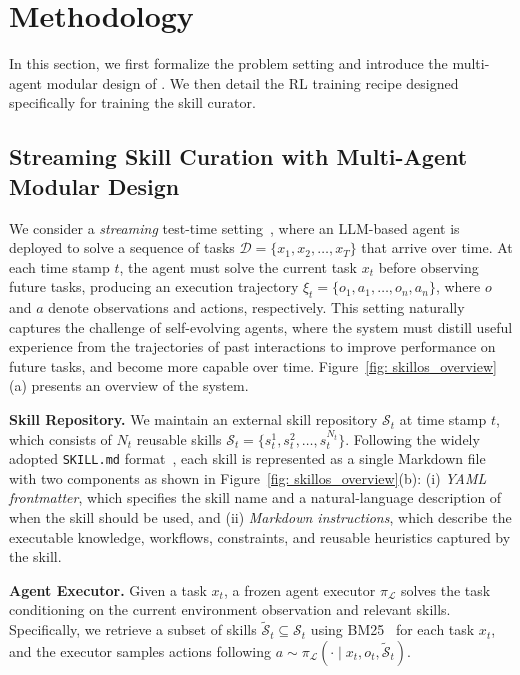 \section{Methodology}

In this section, we first formalize the problem setting and introduce the multi-agent modular design of \ours{}. We then detail the RL training recipe designed specifically for training the skill curator.

\subsection{Streaming Skill Curation with Multi-Agent Modular Design}

We consider a \textit{streaming} test-time setting~\citep{wu2024streambench}, where an LLM-based agent is deployed to solve a sequence of tasks
$\mathcal{D}=\{x_1,x_2,\dots,x_T\}$ that arrive over time. 
At each time stamp $t$, the agent must solve the current task $x_t$ before observing future tasks, producing an execution trajectory
$\xi_t=\{o_1,a_1,\dots,o_n,a_n\}$, where $o$ and $a$ denote observations and actions, respectively.
This setting naturally captures the challenge of self-evolving agents, where the system must distill useful experience from the trajectories of past interactions to improve performance on future tasks, and become more capable over time. Figure~\ref{fig: skillos_overview}\textcolor{redlinkcolor}{(a)} presents an overview of the system.

\noindent\textbf{Skill Repository.}
We maintain an external skill repository $\mathcal{S}_t$ at time stamp $t$, which consists of $N_t$ reusable skills
$\mathcal{S}_t=\{s_t^{1},s_t^{2},\dots,s_t^{N_t}\}$.
Following the widely adopted \texttt{SKILL.md} format~\citep{anthropic_skills_2025}, each skill is represented as a single Markdown file with two components as shown in Figure~\ref{fig: skillos_overview}\textcolor{redlinkcolor}{(b)}: 
(i) \textit{YAML frontmatter}, which specifies the skill name and a natural-language description of when the skill should be used, and 
(ii) \textit{Markdown instructions}, which describe the executable knowledge, workflows, constraints, and reusable heuristics captured by the skill.

\noindent\textbf{Agent Executor.}
Given a task $x_t$, a frozen agent executor $\pi_{\mathcal{L}}$ solves the task conditioning on the current environment observation and relevant skills.
Specifically, we retrieve a subset of skills $\tilde{\mathcal{S}}_{t}\subseteq \mathcal{S}_{t}$ using BM25~\citep{robertson2009probabilistic} for each task $x_t$, and the executor samples actions following
$a \sim \pi_{\mathcal{L}}(\cdot \mid x_t, o_t, \tilde{\mathcal{S}}_{t})$.

